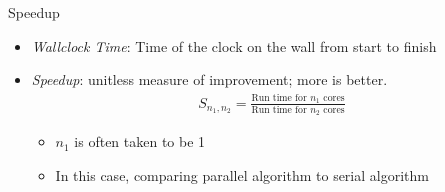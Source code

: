 \begin{frame}
  \begin{block}{Speedup}
  \begin{itemize}
    \item \emph{Wallclock Time}:  Time of the clock on the wall from start to 
finish
    \item \emph{Speedup}:  unitless measure of improvement; more is better.
  \begin{align*}
   S_{n_1, n_2} =  \frac{\text{Run time for } n_1 \text{ cores}}{\text{Run time 
for } n_2 \text{ cores}}
  \end{align*}
  \begin{itemize}
    \item   $n_1$ is often taken to be 1
    \item In this case, comparing parallel algorithm to serial algorithm
  \end{itemize}
  \end{itemize}
  \end{block}
\end{frame}


